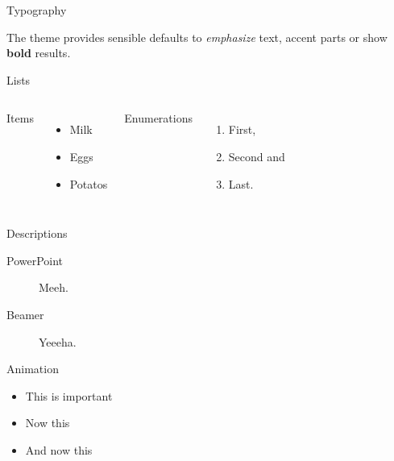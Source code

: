 \documentclass[aspectratio=169]{beamer}
\begin{document}
\begin{frame}{Typography}

The theme provides sensible defaults to \emph{emphasize}
text, \alert{accent} parts or show \textbf{bold} results.
\end{frame}

\begin{frame}{Lists}
  \begin{columns}[onlytextwidth]
      Items
      \begin{itemize}
        \item Milk \item Eggs \item Potatos
      \end{itemize}

      Enumerations
      \begin{enumerate}
        \item First, \item Second and \item Last.
      \end{enumerate}
  \end{columns}
\end{frame}
\begin{frame}{Descriptions}
  \begin{description}
    \item[PowerPoint] Meeh.
    \item[Beamer] Yeeeha.
  \end{description}
\end{frame}
\begin{frame}{Animation}
  \begin{itemize}[<+- | alert@+>]
    \item \alert<4>{This is important}
    \item Now this
    \item And now this
  \end{itemize}
\end{frame}
\end{document}
